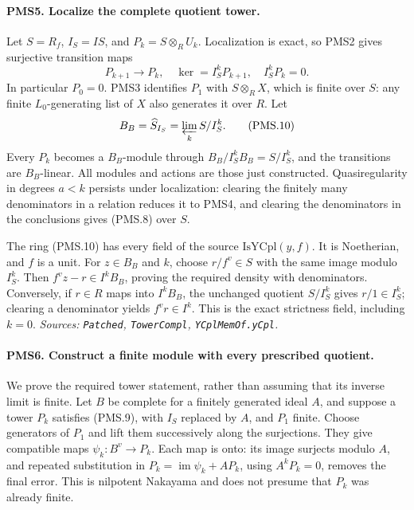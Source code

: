 \paragraph{PMS5. Localize the complete quotient tower.}
\label{claim:PMS5}
Let $S=R_f$, $I_S=IS$, and $P_k=S\otimes_R U_k$.
Localization is exact, so PMS2 gives surjective transition maps
\[
 P_{k+1}\longrightarrow P_k,
 \quad\ker=I_S^kP_{k+1},\quad I_S^kP_k=0.         \tag{PMS.9}
\]
In particular $P_0=0$.  PMS3 identifies $P_1$ with $S\otimes_R X$,
which is finite over $S$: any finite $L_0$-generating list of $X$
also generates it over $R$.
Let
\[
 B_B=\widehat{S}_{I_S}=\varprojlim_k S/I_S^k.      \tag{PMS.10}
\]
Every $P_k$ becomes a $B_B$-module through
$B_B/I_S^kB_B=S/I_S^k$, and the transitions are $B_B$-linear.
All modules and actions are those just constructed.  Quasiregularity
in degrees $a<k$ persists under localization: clearing the finitely
many denominators in a relation reduces it to PMS4, and clearing the
denominators in the conclusions gives (PMS.8) over $S$.

The ring (PMS.10) has every field of the source $\mathrm{IsYCpl}(y,f)$.
It is Noetherian, and $f$ is a unit.  For $z\in B_B$ and $k$, choose
$r/f^v\in S$ with the same image modulo $I_S^k$.  Then
$f^vz-r\in I^kB_B$, proving the required density with denominators.
Conversely, if $r\in R$ maps into $I^kB_B$, the unchanged quotient
$S/I_S^k$ gives $r/1\in I_S^k$; clearing a denominator yields
$f^vr\in I^k$.  This is the exact strictness field, including $k=0$.
\hfill\textit{Sources: \texttt{Patched}, \texttt{TowerCompl},
\texttt{YCplMemOf.yCpl}.}

\paragraph{PMS6. Construct a finite module with every prescribed quotient.}
\label{claim:PMS6}
We prove the required tower statement, rather than assuming that its
inverse limit is finite.  Let $B$ be complete for a finitely generated
ideal $A$, and suppose a tower $P_k$ satisfies (PMS.9), with $I_S$
replaced by $A$, and $P_1$ finite.  Choose generators of $P_1$ and
lift them successively along the surjections.  They give compatible
maps $\psi_k:B^v\to P_k$.  Each map is onto: its image surjects
modulo $A$, and repeated substitution in
$P_k=\operatorname{im}\psi_k+AP_k$, using $A^kP_k=0$, removes
the final error.  This is nilpotent Nakayama and does not presume
that $P_k$ was already finite.


